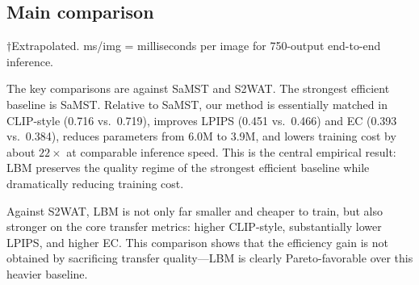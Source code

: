 ﻿\documentclass[letterpaper]{article}
\begin{document}
\subsection{Main comparison}
\begin{table}[t]
\centering
\caption{Strict-750 comparison with efficiency. $\uparrow$ = higher is better, $\downarrow$ = lower is better. Inference time end-to-end for 750 images. Training times marked $\dagger$ are extrapolated.}
\label{tab:main}
\small
\setlength{\tabcolsep}{5pt}
\smallskip
\footnoterule\small
$\dagger$Extrapolated. ms/img = milliseconds per image for 750-output end-to-end inference.
\end{table}

The key comparisons are against SaMST and S2WAT. The strongest efficient baseline is SaMST. Relative to SaMST, our method is essentially matched in CLIP-style (0.716 vs.\ 0.719), improves LPIPS (0.451 vs.\ 0.466) and EC (0.393 vs.\ 0.384), reduces parameters from 6.0M to 3.9M, and lowers training cost by about $22\times$ at comparable inference speed. This is the central empirical result: LBM preserves the quality regime of the strongest efficient baseline while dramatically reducing training cost.

Against S2WAT, LBM is not only far smaller and cheaper to train, but also stronger on the core transfer metrics: higher CLIP-style, substantially lower LPIPS, and higher EC. This comparison shows that the efficiency gain is not obtained by sacrificing transfer quality---LBM is clearly Pareto-favorable over this heavier baseline.
\end{document}
